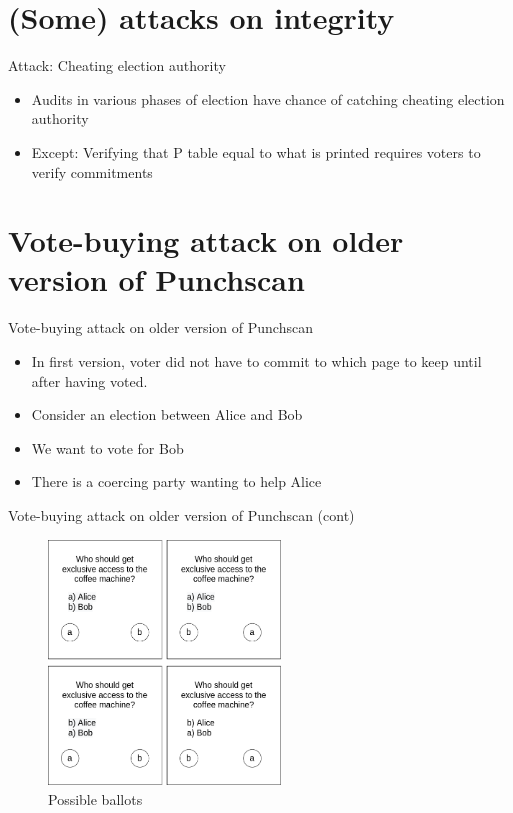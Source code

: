 \documentclass{beamer}
\begin{document}
\section{(Some) attacks on integrity}

\begin{frame}{Attack: Cheating election authority}
	\begin{itemize}
		\item Audits in various phases of election have chance of
			catching cheating election authority
		\item Except: Verifying that P table equal to what is printed
			requires voters to verify commitments
	\end{itemize}
\end{frame}

\section{Vote-buying attack on older version of Punchscan}

\begin{frame}{Vote-buying attack on older version of Punchscan}
	\begin{itemize}
		\item In first version, voter did not have to commit to which
			page to keep until after having voted.
		\item Consider an election between Alice and Bob
		\item We want to vote for Bob
		\item There is a coercing party wanting to help Alice
	\end{itemize}
\end{frame}

\begin{frame}{Vote-buying attack on older version of Punchscan (cont)}
	\begin{figure}
		\centering
		\includegraphics[width=0.55\textwidth]{../resources/vote_buying.drawio.png}
		\caption{Possible ballots}
	\end{figure}
\end{frame}
\end{document}

